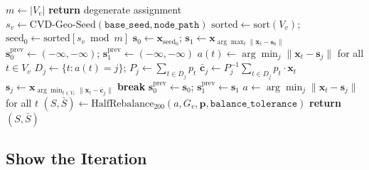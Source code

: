 \begin{algorithm}[t]
\caption{\cvdgeo{}-\textsc{Bisect}($G_v$, $\mathbf{x}$, $\mathbf{p}$,
  $\mathtt{base\_seed}$, $\mathtt{node\_path}$, $\mathtt{cvd\_iters}$,
  $\mathtt{balance\_tolerance}$)}
\label{alg:cvdgeo}
\begin{algorithmic}[1]
\State $m \gets |V_v|$
  \textbf{return} degenerate assignment
\EndIf
\State $s_v \gets \mathrm{CVD\text{-}Geo\text{-}Seed}(\mathtt{base\_seed}, \mathtt{node\_path})$
\State $\mathrm{sorted} \gets \mathrm{sort}(V_v)$;
       $\mathrm{seed}_0 \gets \mathrm{sorted}[s_v \bmod m]$
\State $\mathbf{s}_0 \gets \mathbf{x}_{\mathrm{seed}_0}$;
       $\mathbf{s}_1 \gets \mathbf{x}_{\arg\max_t \|\mathbf{x}_t - \mathbf{s}_0\|}$
\State $\mathbf{s}_0^{\mathrm{prev}} \gets (-\infty, -\infty)$;
       $\mathbf{s}_1^{\mathrm{prev}} \gets (-\infty, -\infty)$
  \State $a(t) \gets \arg\min_{j} \|\mathbf{x}_t - \mathbf{s}_j\|$ for all $t \in V_v$
    \State $D_j \gets \{t : a(t) = j\}$;
           $P_j \gets \sum_{t \in D_j} p_t$
    \State $\bar{\mathbf{c}}_j \gets P_j^{-1}\sum_{t \in D_j} p_t \cdot \mathbf{x}_t$
    \State $\mathbf{s}_j \gets \mathbf{x}_{\arg\min_{t \in V_v} \|\mathbf{x}_t - \bar{\mathbf{c}}_j\|}$
  \EndFor
    \textbf{break}
  \EndIf
  \State $\mathbf{s}_0^{\mathrm{prev}} \gets \mathbf{s}_0$;
         $\mathbf{s}_1^{\mathrm{prev}} \gets \mathbf{s}_1$
\EndFor
\State $a \gets \arg\min_j \|\mathbf{x}_t - \mathbf{s}_j\|$ for all $t$
\State $(S, \bar{S}) \gets \mathrm{HalfRebalance}_{200}(a, G_v, \mathbf{p}, \mathtt{balance\_tolerance})$
\State \textbf{return} $(S, \bar{S})$
\end{algorithmic}
\end{algorithm}

\subsection{Show the Iteration}

